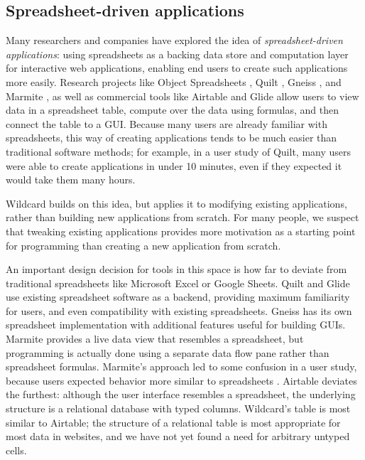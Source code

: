 \documentclass[english]{programming}
\begin{document}
\hypertarget{spreadsheet-driven-applications}{%
\subsection{Spreadsheet-driven
applications}\label{spreadsheet-driven-applications}}

Many researchers and companies have explored the idea of
\emph{spreadsheet-driven applications}: using spreadsheets as a backing
data store and computation layer for interactive web applications,
enabling end users to create such applications more easily. Research
projects like Object Spreadsheets \autocite{mccutchen2016}, Quilt
\autocite{benson2014}, Gneiss \autocite{chang2014}, and Marmite
\autocite{wong2007}, as well as commercial tools like Airtable
\autocite{zotero-79} and Glide \autocite{zotero-81} allow users to view
data in a spreadsheet table, compute over the data using formulas, and
then connect the table to a GUI. Because many users are already familiar
with spreadsheets, this way of creating applications tends to be much
easier than traditional software methods; for example, in a user study
of Quilt, many users were able to create applications in under 10
minutes, even if they expected it would take them many hours.

Wildcard builds on this idea, but applies it to modifying existing
applications, rather than building new applications from scratch. For
many people, we suspect that tweaking existing applications provides
more motivation as a starting point for programming than creating a new
application from scratch.

An important design decision for tools in this space is how far to
deviate from traditional spreadsheets like Microsoft Excel or Google
Sheets. Quilt and Glide use existing spreadsheet software as a backend,
providing maximum familiarity for users, and even compatibility with
existing spreadsheets. Gneiss has its own spreadsheet implementation
with additional features useful for building GUIs. Marmite provides a
live data view that resembles a spreadsheet, but programming is actually
done using a separate data flow pane rather than spreadsheet formulas.
Marmite's approach led to some confusion in a user study, because users
expected behavior more similar to spreadsheets \autocite{wong2007}.
Airtable deviates the furthest: although the user interface resembles a
spreadsheet, the underlying structure is a relational database with
typed columns. Wildcard's table is most similar to Airtable; the
structure of a relational table is most appropriate for most data in
websites, and we have not yet found a need for arbitrary untyped cells.
\end{document}
